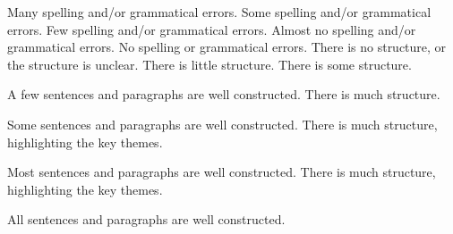 \documentclass{../../../fal_assignment}
\begin{document}
\begin{markingrubric}
	\grade 		Many spelling and/or grammatical errors.
	\grade 		Some spelling and/or grammatical errors.  
	\grade 		Few spelling and/or grammatical errors.
	\grade 		Almost no spelling and/or grammatical errors.
	\grade 		No spelling or grammatical errors.
	\grade\fail 	There is no structure, or the structure is unclear.
	\grade 		There is little structure.
	\grade 		There is some structure.
	\par 		A few sentences and paragraphs are well constructed.
	\grade 		There is much structure.
	\par 		Some sentences and paragraphs are well constructed.
	\grade 		There is much structure, highlighting the key themes.
	\par 		Most sentences and paragraphs are well constructed.
	\grade 		There is much structure, highlighting the key themes.
	\par 		All sentences and paragraphs are well constructed.
\end{markingrubric}
\end{document}

